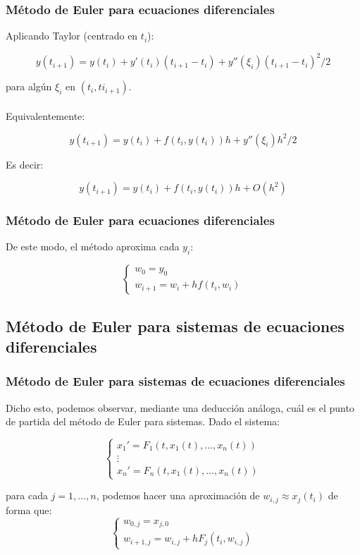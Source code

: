 \documentclass{beamer}
\begin{document}
\begin{frame}
	\frametitle{Método de Euler para ecuaciones diferenciales}
	Aplicando Taylor (centrado en $t_i$):

	$$y(t_{i+1})=y(t_i) + y'(t_i)(t_{i+1}-t_i) + y''(\xi_i)(t_{i+1}-t_i)^2/2$$ 

	para algún $\xi_i$ en $(t_i, ti_{i+1})$.\\~\\
	
	Equivalentemente:
	
	$$y(t_{i+1})=y(t_i) + f(t_i,y(t_i))h + y''(\xi_i)h^2/2$$
	
	Es decir: 
	
	$$y(t_{i+1})=y(t_i) + f(t_i,y(t_i))h + O(h^2)$$ 
	
\end{frame}

\begin{frame}
	\frametitle{Método de Euler para ecuaciones diferenciales}
	
	De este modo, el método aproxima cada $y_i$:
	
	$$
	\begin{cases}
	w_0=y_0\\
	w_{i+1}=w_i + hf(t_i,w_i)
	\end{cases}
	$$
\end{frame}

\subsection{Método de Euler para sistemas de ecuaciones diferenciales}
\begin{frame}
	\frametitle{Método de Euler para sistemas de ecuaciones diferenciales}
	
	Dicho esto, podemos observar, mediante una deducción análoga, cuál es el punto de partida del método de Euler para sistemas. Dado el sistema:
	
	$$
	\begin{cases}
	x_1'=F_1(t,x_1(t),...,x_n(t)) \\
	\vdots\\
	x_n'=F_n(t,x_1(t),...,x_n(t))
	\end{cases}
	$$
	
 para cada $j=1,...,n$, podemos hacer una aproximación de $w_{i,j} \approx x_j(t_i)$ de forma que:
 $$
 \begin{cases}
 w_{0,j}=x_{j,0} \\
 w_{i+1,j}=w_{i,j}+ hF_j(t_i,w_{i,j})
 \end{cases}
 $$ 
\end{frame}
\end{document}
